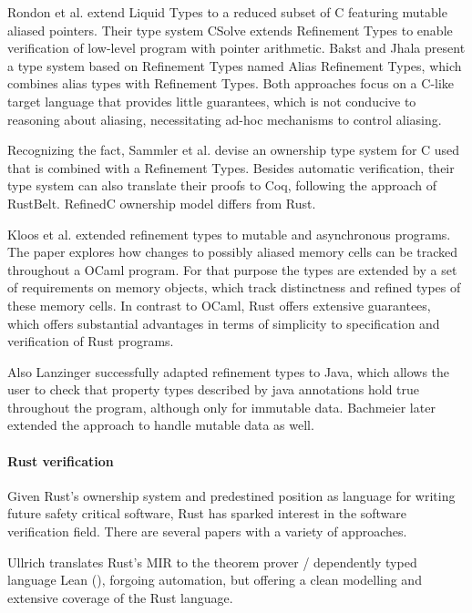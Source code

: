 Rondon et al. \cite{rondon_low-level_2010} extend Liquid Types to a reduced subset of C featuring mutable aliased pointers. Their type system CSolve extends Refinement Types to enable verification of low-level program with pointer arithmetic.
Bakst and Jhala \cite{bakst_predicate_2016} present a type system based on Refinement Types named Alias Refinement Types, which combines alias types with Refinement Types.
Both approaches focus on a C-like target language that provides little guarantees, which is not conducive to reasoning about aliasing, necessitating ad-hoc mechanisms to control aliasing.

Recognizing the fact, Sammler et al. \cite{sammler_refinedc_2021} devise an ownership type system for C used that is combined with a Refinement Types. 
Besides automatic verification, their type system can also translate their proofs to Coq, following the approach of RustBelt.
RefinedC ownership model differs from Rust.

Kloos et al. \cite{kloos_asynchronous_2015} extended refinement types to mutable and asynchronous programs. The paper explores how changes to possibly aliased memory cells can be tracked throughout a OCaml program. For that purpose the types are extended by a set of requirements on memory objects, which track distinctness and refined types of these memory cells. In contrast to OCaml, Rust offers extensive guarantees, which offers substantial advantages in terms of simplicity to specification and verification of Rust programs.


Also Lanzinger \cite{lanzinger_property_2021} successfully adapted refinement types to Java, which allows the user to check that property types described by java annotations hold true throughout the program, although only for immutable data. Bachmeier \cite{bachmeier_property_2022} later extended the approach to handle mutable data as well.




\paragraph*{Rust verification}



Given Rust's ownership system and predestined position as language for writing future safety critical software, Rust has sparked interest in the software verification field. There are several papers with a variety of approaches.


Ullrich \cite{ullrich_simple_nodate} translates Rust's MIR to the theorem prover / dependently typed language Lean (\cite{de_moura_lean_2015}), forgoing automation, but offering a clean modelling and extensive coverage of the Rust language.

